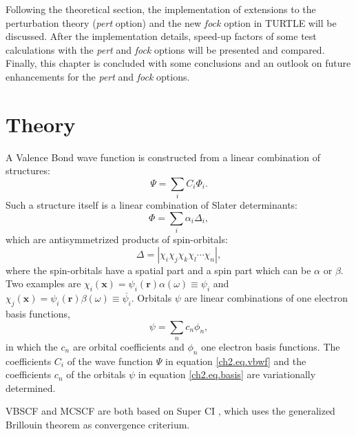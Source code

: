 Following the theoretical section, the implementation of extensions to the perturbation theory (\textit{pert} option) and the new \textit{fock} option in TURTLE will be discussed. After the implementation details, speed-up factors of some test calculations with the \textit{pert} and \textit{fock} options will be presented and compared. Finally, this chapter is concluded with some conclusions and an outlook on future enhancements for the \textit{pert} and \textit{fock} options.  

\section{Theory}

A Valence Bond wave function is constructed from a linear combination of structures:
\begin{equation}
\Psi = \sum_{i} C_i \Phi_i.
\label{ch2.eq.vbwf}
\end{equation}
Such a structure itself is a linear combination of Slater determinants:
\begin{equation}
\Phi = \sum_{i} \alpha_i \Delta_i,
\label{ch2.eq.struct}
\end{equation}
which are antisymmetrized products of spin-orbitals:
\begin{equation}
\Delta = |\chi_i\chi_j\chi_k\chi_l \cdots \chi_n|,
\label{ch2.eq.determ}
\end{equation}
where the spin-orbitals have a spatial part and a spin part which can be $\alpha$ or $\beta$. Two examples are  $\chi_i(\mathbf{x})=\psi_i(\mathbf{r})\alpha(\omega)\equiv\psi_i$ and $\chi_j(\mathbf{x})=\psi_i(\mathbf{r})\beta(\omega)\equiv\overline{\psi_i}$.
Orbitals $\psi$ are linear combinations of one electron basis functions,
\begin{equation}
\psi = \sum_{n} c_n \phi_n,
\label{ch2.eq.basis}
\end{equation}
in which the $c_n$ are orbital coefficients and $\phi_n$ one electron basis functions. The coefficients $C_i$ of the wave function $\Psi$ in equation \ref{ch2.eq.vbwf} and the coefficients $c_n$ of the orbitals $\psi$ in equation \ref{ch2.eq.basis} are variationally determined. 

VBSCF and MCSCF are both based on Super CI \cite{superci1,superci2}, which uses the generalized Brillouin theorem \cite{brillouin,genbrill} as convergence criterium.

